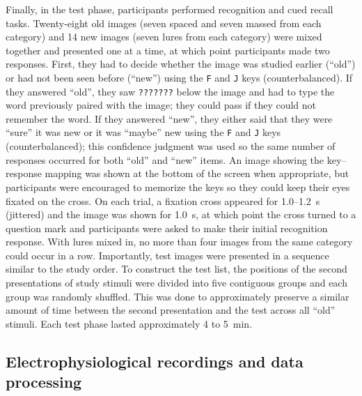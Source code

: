 Finally, in the test phase, participants performed recognition and cued recall tasks.  Twenty-eight old images (seven spaced and seven massed from each category) and 14 new images (seven lures from each category) were mixed together and presented one at a time, at which point participants made two responses.  First, they had to decide whether the image was studied earlier (``old'') or had not been seen before (``new'') using the \texttt{F} and \texttt{J} keys (counterbalanced).  If they answered ``old'', they saw \texttt{???????} below the image and had to type the word previously paired with the image; they could pass if they could not remember the word.  If they answered ``new'', they either said that they were ``sure'' it was new or it was ``maybe'' new using the \texttt{F} and \texttt{J} keys (counterbalanced); this confidence judgment was used so the same number of responses occurred for both ``old'' and ``new'' items. An image showing the key--response mapping was shown at the bottom of the screen when appropriate, but participants were encouraged to memorize the keys so they could keep their eyes fixated on the cross.  On each trial, a fixation cross appeared for 1.0--1.2~s (jittered) and the image was shown for 1.0~s, at which point the cross turned to a question mark and participants were asked to make their initial recognition response.  With lures mixed in, no more than four images from the same category could occur in a row.  Importantly, test images were presented in a sequence similar to the study order.  To construct the test list, the positions of the second presentations of study stimuli were divided into five contiguous groups and each group was randomly shuffled.  This was done to approximately preserve a similar amount of time between the second presentation and the test across all ``old'' stimuli.  Each test phase lasted approximately 4 to 5~min.



\subsection{Electrophysiological recordings and data processing}

